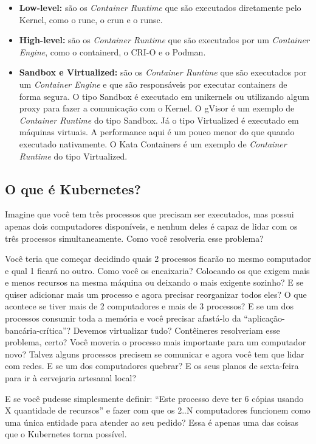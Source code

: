 \documentclass[12pt,a4paper]{article}
\begin{document}
\begin{itemize}
    \item \textbf{Low-level:} são os \textit{Container Runtime} que são executados diretamente pelo Kernel, como o runc, o crun e o runsc.
    \item \textbf{High-level:} são os \textit{Container Runtime} que são executados por um \textit{Container Engine}, como o containerd, o CRI-O e o Podman.
    \item \textbf{Sandbox e Virtualized:} são os \textit{Container Runtime} que são executados por um \textit{Container Engine} e que são responsáveis por executar containers de forma segura. O tipo Sandbox é executado em unikernels ou utilizando algum proxy para fazer a comunicação com o Kernel. O gVisor é um exemplo de \textit{Container Runtime} do tipo Sandbox. Já o tipo Virtualized é executado em máquinas virtuais. A performance aqui é um pouco menor do que quando executado nativamente. O Kata Containers é um exemplo de \textit{Container Runtime} do tipo Virtualized.
\end{itemize}

\vspace{1em}

\subsection{O que é Kubernetes?}
\label{sec:oquee}
Imagine que você tem três processos que precisam ser executados, mas possui apenas dois computadores disponíveis, e nenhum deles é capaz de lidar com os três processos simultaneamente. Como você resolveria esse problema?

Você teria que começar decidindo quais 2 processos ficarão no mesmo computador e qual 1 ficará no outro. Como você os encaixaria? Colocando os que exigem mais e menos recursos na mesma máquina ou deixando o mais exigente sozinho? E se quiser adicionar mais um processo e agora precisar reorganizar todos eles? O que acontece se tiver mais de 2 computadores e mais de 3 processos? E se um dos processos consumir toda a memória e você precisar afastá-lo da ``aplicação-bancária-crítica''? Devemos virtualizar tudo? Contêineres resolveriam esse problema, certo? Você moveria o processo mais importante para um computador novo? Talvez alguns processos precisem se comunicar e agora você tem que lidar com redes. E se um dos computadores quebrar? E os seus planos de sexta-feira para ir à cervejaria artesanal local?

E se você pudesse simplesmente definir: ``Este processo deve ter 6 cópias usando X quantidade de recursos'' e fazer com que os 2..N computadores funcionem como uma única entidade para atender ao seu pedido? Essa é apenas uma das coisas que o Kubernetes torna possível.
\end{document}
